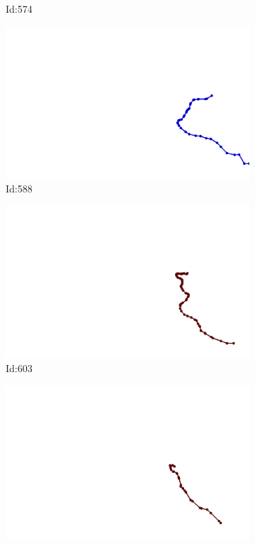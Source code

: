 \documentclass[12pt,twoside]{report}
\begin{document}
\begin{figure}
\begin{subfigure}[b]{0.20\textwidth}
\caption{Id:574}
\end{subfigure}
\begin{subfigure}[b]{0.20\textwidth}
\centering
\includegraphics[width=\textwidth]{../trajectories/588.png}
\caption{Id:588}
\end{subfigure}
\begin{subfigure}[b]{0.20\textwidth}
\centering
\includegraphics[width=\textwidth]{../trajectories/603.png}
\caption{Id:603}
\end{subfigure}
\begin{subfigure}[b]{0.20\textwidth}
\centering
\includegraphics[width=\textwidth]{../trajectories/624.png}

\end{subfigure}
\end{figure}
\end{document}
